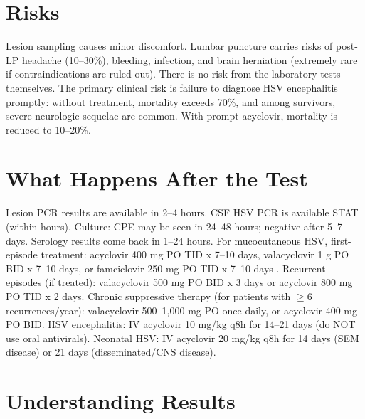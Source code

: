 \section*{Risks}
Lesion sampling causes minor discomfort. Lumbar puncture carries risks of post-LP headache (10--30\%), bleeding, infection, and brain herniation (extremely rare if contraindications are ruled out). There is no risk from the laboratory tests themselves. The primary clinical risk is failure to diagnose HSV encephalitis promptly: without treatment, mortality exceeds 70\%, and among survivors, severe neurologic sequelae are common. With prompt acyclovir, mortality is reduced to 10--20\%.

\section*{What Happens After the Test}
Lesion PCR results are available in 2--4 hours. CSF HSV PCR is available STAT (within hours). Culture: CPE may be seen in 24--48 hours; negative after 5--7 days. Serology results come back in 1--24 hours. For mucocutaneous HSV, first-episode treatment: acyclovir 400 mg PO TID x 7--10 days, valacyclovir 1 g PO BID x 7--10 days, or famciclovir 250 mg PO TID x 7--10 days \cite{workowski2021sexually}. Recurrent episodes (if treated): valacyclovir 500 mg PO BID x 3 days or acyclovir 800 mg PO TID x 2 days. Chronic suppressive therapy (for patients with $\geq$6 recurrences/year): valacyclovir 500--1,000 mg PO once daily, or acyclovir 400 mg PO BID. HSV encephalitis: IV acyclovir 10 mg/kg q8h for 14--21 days (do NOT use oral antivirals). Neonatal HSV: IV acyclovir 20 mg/kg q8h for 14 days (SEM disease) or 21 days (disseminated/CNS disease).

\section*{Understanding Results}

